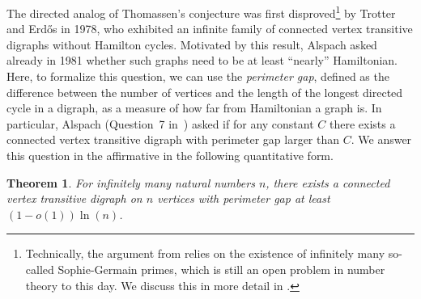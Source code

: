\documentclass[english,11pt]{article}
\newtheorem{theorem}{Theorem}[section]
\newtheorem{problem}[theorem]{Problem}
\theoremstyle{definition}
\numberwithin{equation}{section}
\numberwithin{figure}{section}
\begin{document}

The directed analog of Thomassen's conjecture was first disproved\footnote{Technically, the argument from \cite{TrotterErdos} relies on the existence of infinitely many so-called Sophie-Germain primes, which is still an open problem in number theory to this day. We discuss this in more detail in .} by Trotter and Erd\H{o}s \cite{TrotterErdos} in 1978, who exhibited an infinite family of connected vertex transitive digraphs without Hamilton cycles. Motivated by this result, Alspach asked already in 1981 whether such graphs need to be at least ``nearly'' Hamiltonian. Here, to formalize this question, we can use the \emph{perimeter gap}, defined as the difference between the number of vertices and the length of the longest directed cycle in a digraph, as a measure of how far from Hamiltonian a graph is. In particular, Alspach (Question~7 in~\cite{alspach81}) asked if for any constant $C$ there exists a connected vertex transitive digraph with perimeter gap larger than $C$. We answer this question in the affirmative in the following quantitative form.

\begin{theorem}\label{thm:cycles-short}
    For infinitely many natural numbers $n$, there exists a connected vertex transitive digraph on $n$ vertices with perimeter gap at least $(1-o(1))\ln(n)$. 
\end{theorem}
\end{document}
